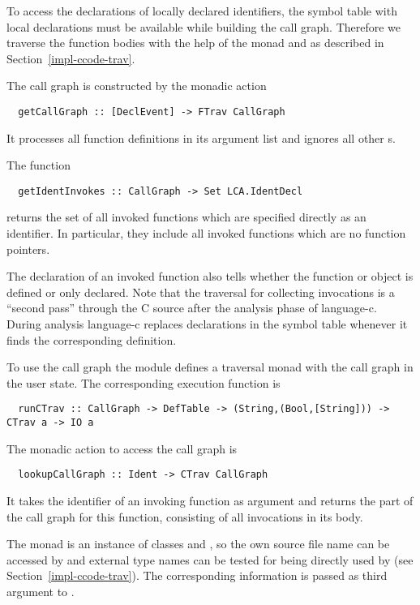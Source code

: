 To access the declarations of locally declared identifiers, the symbol table with local declarations
must be available while building the call graph. Therefore we traverse the function bodies with the help of
the  monad and  as described in Section~\ref{impl-ccode-trav}.

The call graph is constructed by the monadic action
\begin{verbatim}
  getCallGraph :: [DeclEvent] -> FTrav CallGraph
\end{verbatim}
It processes all function definitions in its argument list and ignores all other s.

The function 
\begin{verbatim}
  getIdentInvokes :: CallGraph -> Set LCA.IdentDecl
\end{verbatim}
returns the set of all invoked functions which are specified directly as an identifier. In particular, they include
all invoked functions which are no function pointers.

The declaration of an invoked function also tells 
whether the function or object is defined or only declared. Note that the traversal for collecting invocations is a ``second 
pass'' through the C source after the analysis phase of language-c. During analysis language-c replaces
declarations in the symbol table whenever it finds the corresponding definition.

To use the call graph the  module defines a traversal monad  
with the call graph in the user state. The corresponding execution function is
\begin{verbatim}
  runCTrav :: CallGraph -> DefTable -> (String,(Bool,[String])) -> CTrav a -> IO a
\end{verbatim}
The monadic action to access the call graph is
\begin{verbatim}
  lookupCallGraph :: Ident -> CTrav CallGraph
\end{verbatim}
It takes the identifier of an invoking function as argument and returns the part of the call graph for this function,
consisting of all invocations in its body.

The monad  is an instance of classes  and , so the own source file 
name can be accessed by  and external type names can be tested for being directly used by 
 (see Section~\ref{impl-ccode-trav}). The corresponding information is passed as third argument
to .
